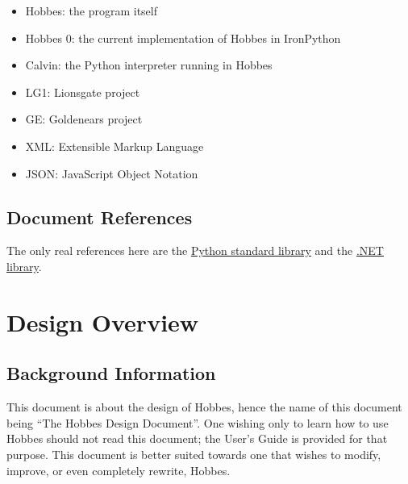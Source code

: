 \documentclass[12pt,letterpaper]{article}
\begin{document}
\begin{itemize}

\item Hobbes: the program itself

\item Hobbes 0: the current implementation of Hobbes in IronPython

\item Calvin: the Python interpreter running in Hobbes

\item LG1: Lionsgate project

\item GE: Goldenears project

\item XML: Extensible Markup Language

\item JSON: JavaScript Object Notation

\end{itemize}



%
%
\subsection{Document References}
\label{0.3}

The only real references here are the \href{http://docs.python.org/library/}{Python standard library} and the \href{http://msdn.microsoft.com/en-us/library/gg145045.aspx}{.NET library}.



%
%
\section{Design Overview}
\label{1}

\setcounter{subsection}{-1}



%
%
\subsection{Background Information}
\label{1.0}

This document is about the design of Hobbes, hence the name of this document being ``The Hobbes Design Document''. One wishing only to learn how to use Hobbes should not read this document; the User's Guide is provided for that purpose. This document is better suited towards one that wishes to modify, improve, or even completely rewrite, Hobbes.
\end{document}
